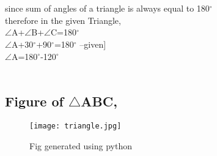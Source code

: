 \documentclass[a4paper,12pt]{article}
\begin{document}
\\

\\

since sum of angles of a triangle is always equal to 180$^{\circ}$\\

therefore in the given Triangle,\\

$\angle$A+$\angle$B+$\angle$C=180$^{\circ}$\\

$\angle$A+30$^{\circ}$+90$^{\circ}$=180$^{\circ}$ \hspace{3cm}{[\angle$B=30$^{\circ}$ and $\angle$C=90$^{\circ}$}--given]\\

$\angle$A=180$^{\circ}$-120$^{\circ}$\\

\\
\subsection{Figure of $\triangle$ABC,}
\begin{figure}[htp]
    \centering
    \texttt{[image: triangle.jpg]}
    \caption{Fig generated using python}
    \label{fig:2}
\end{figure}


 \\
 
\end{document}
